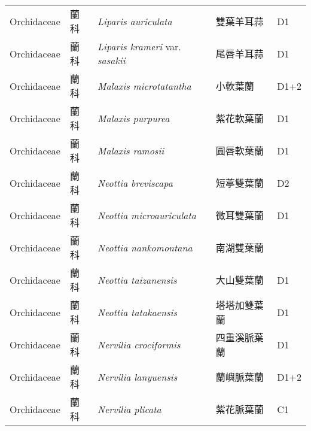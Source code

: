{\begin{longtable}{p{2.5cm}p{2.5cm}p{4.5cm}p{2.5cm}p{3cm}}
    Orchidaceae & 蘭科 & \textit{Liparis auriculata}  & 雙葉羊耳蒜 & D1 \index{Liparis@\textit{Liparis}!auriculata@\textit{auriculata}}  \index{雙葉羊耳蒜} \\
    Orchidaceae & 蘭科 & \textit{Liparis krameri} var. \textit{sasakii}  & 尾唇羊耳蒜 & D1 \index{Liparis@\textit{Liparis}!krameri@\textit{krameri}!var. sasakii@var. \textit{sasakii}}  \index{尾唇羊耳蒜} \\
    Orchidaceae & 蘭科 & \textit{Malaxis microtatantha}  & 小軟葉蘭 & D1+2 \index{Malaxis@\textit{Malaxis}!microtatantha@\textit{microtatantha}}  \index{小軟葉蘭} \\
    Orchidaceae & 蘭科 & \textit{Malaxis purpurea}  & 紫花軟葉蘭 & D1 \index{Malaxis@\textit{Malaxis}!purpurea@\textit{purpurea}}  \index{紫花軟葉蘭} \\
    Orchidaceae & 蘭科 & \textit{Malaxis ramosii}  & 圓唇軟葉蘭 & D1 \index{Malaxis@\textit{Malaxis}!ramosii@\textit{ramosii}}  \index{圓唇軟葉蘭} \\
    Orchidaceae & 蘭科 & \textit{Neottia breviscapa}  & 短葶雙葉蘭 & D2 \index{Neottia@\textit{Neottia}!breviscapa@\textit{breviscapa}}  \index{短葶雙葉蘭} \\
    Orchidaceae & 蘭科 & \textit{Neottia microauriculata}  & 微耳雙葉蘭 & D1 \index{Neottia@\textit{Neottia}!microauriculata@\textit{microauriculata}}  \index{微耳雙葉蘭} \\
    Orchidaceae & 蘭科 & \textit{Neottia nankomontana}  & 南湖雙葉蘭 &  \index{Neottia@\textit{Neottia}!nankomontana@\textit{nankomontana}}  \index{南湖雙葉蘭} \\
    Orchidaceae & 蘭科 & \textit{Neottia taizanensis}  & 大山雙葉蘭 & D1 \index{Neottia@\textit{Neottia}!taizanensis@\textit{taizanensis}}  \index{大山雙葉蘭} \\
    Orchidaceae & 蘭科 & \textit{Neottia tatakaensis}  & 塔塔加雙葉蘭 & D1 \index{Neottia@\textit{Neottia}!tatakaensis@\textit{tatakaensis}}  \index{塔塔加雙葉蘭} \\
    Orchidaceae & 蘭科 & \textit{Nervilia crociformis}  & 四重溪脈葉蘭 & D1 \index{Nervilia@\textit{Nervilia}!crociformis@\textit{crociformis}}  \index{四重溪脈葉蘭} \\
    Orchidaceae & 蘭科 & \textit{Nervilia lanyuensis}  & 蘭嶼脈葉蘭 & D1+2 \index{Nervilia@\textit{Nervilia}!lanyuensis@\textit{lanyuensis}}  \index{蘭嶼脈葉蘭} \\
    Orchidaceae & 蘭科 & \textit{Nervilia plicata}  & 紫花脈葉蘭 & C1 \index{Nervilia@\textit{Nervilia}!plicata@\textit{plicata}}  \index{紫花脈葉蘭} \\

\end{longtable}}
